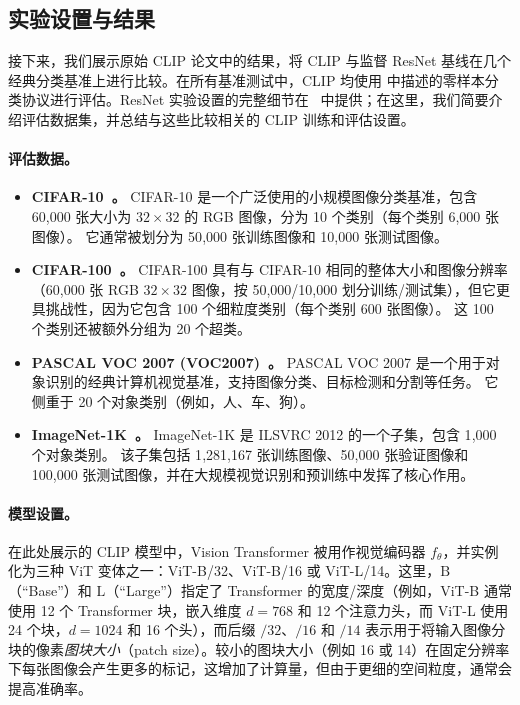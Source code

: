 \documentclass[../../book-main_zh.tex]{subfiles}
\begin{document}
\subsection{实验设置与结果}

接下来，我们展示原始 CLIP 论文中的结果，将 CLIP 与监督 ResNet 基线在几个经典分类基准上进行比较。在所有基准测试中，CLIP 均使用  中描述的零样本分类协议进行评估。ResNet 实验设置的完整细节在~\citep{He2016-lc} 中提供；在这里，我们简要介绍评估数据集，并总结与这些比较相关的 CLIP 训练和评估设置。

\paragraph{评估数据。}
\begin{itemize}
    \item \textbf{CIFAR-10~\citep{krizhevsky2009learning}。}
    CIFAR-10 是一个广泛使用的小规模图像分类基准，包含 60{,}000 张大小为 \(32\times 32\) 的 RGB 图像，分为 10 个类别（每个类别 6{,}000 张图像）。
    它通常被划分为 50{,}000 张训练图像和 10{,}000 张测试图像。

    \item \textbf{CIFAR-100~\citep{krizhevsky2009learning}。}
    CIFAR-100 具有与 CIFAR-10 相同的整体大小和图像分辨率（60{,}000 张 RGB \(32\times 32\) 图像，按 50{,}000/10{,}000 划分训练/测试集），但它更具挑战性，因为它包含 100 个细粒度类别（每个类别 600 张图像）。
    这 100 个类别还被额外分组为 20 个超类。

    \item \textbf{PASCAL VOC 2007 (VOC2007)~\citep{everingham2010pascal}。}
    PASCAL VOC 2007 是一个用于对象识别的经典计算机视觉基准，支持图像分类、目标检测和分割等任务。
    它侧重于 20 个对象类别（例如，人、车、狗）。

    \item \textbf{ImageNet-1K~\citep{imagenet_cvpr09}。}
    ImageNet-1K 是 ILSVRC 2012 的一个子集，包含 1{,}000 个对象类别。
    该子集包括 1{,}281{,}167 张训练图像、50{,}000 张验证图像和 100{,}000 张测试图像，并在大规模视觉识别和预训练中发挥了核心作用。
\end{itemize}

\paragraph{模型设置。}
在此处展示的 CLIP 模型中，Vision Transformer 被用作视觉编码器 \(f_{\theta}\)，并实例化为三种 ViT 变体之一：ViT-B/32、ViT-B/16 或 ViT-L/14。这里，\(\text{B}\)（“Base”）和 \(\text{L}\)（“Large”）指定了 Transformer 的宽度/深度（例如，ViT-B 通常使用 12 个 Transformer 块，嵌入维度 \(d=768\) 和 12 个注意力头，而 ViT-L 使用 24 个块，\(d=1024\) 和 16 个头），而后缀 \(/32\)、\(/16\) 和 \(/14\) 表示用于将输入图像分块的像素\emph{图块大小}（patch size）。较小的图块大小（例如 16 或 14）在固定分辨率下每张图像会产生更多的标记，这增加了计算量，但由于更细的空间粒度，通常会提高准确率。
\end{document}
